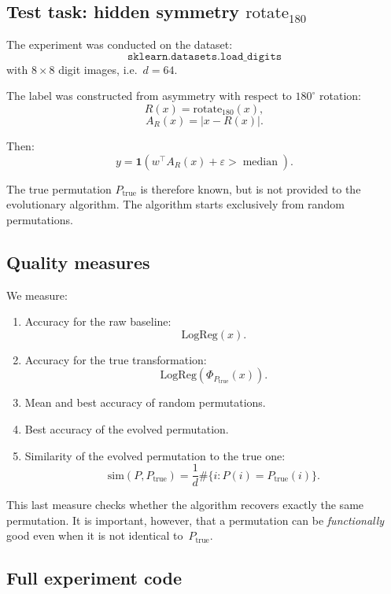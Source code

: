 \documentclass[11pt,a4paper]{report}
\begin{document}
\subsection{Test task: hidden symmetry \texorpdfstring{$\mathrm{rotate}_{180}$}{rotate180}}

The experiment was conducted on the dataset:
\[
\texttt{sklearn.datasets.load\_digits}
\]
with $8\times 8$ digit images, i.e.\ $d=64$.

The label was constructed from asymmetry with respect to $180^\circ$ rotation:
\[
R(x)=\mathrm{rotate}_{180}(x),
\]
\[
A_R(x)=|x-R(x)|.
\]

Then:
\[
y=
\mathbf 1
\left(
w^\top A_R(x)+\varepsilon
>
\operatorname{median}
\right).
\]

The true permutation $P_{\mathrm{true}}$ is therefore known, but is not provided to the evolutionary algorithm. The algorithm starts exclusively from random permutations.

\subsection{Quality measures}

We measure:

\begin{enumerate}
\item Accuracy for the raw baseline:
\[
\mathrm{LogReg}(x).
\]

\item Accuracy for the true transformation:
\[
\mathrm{LogReg}(\Phi_{P_{\mathrm{true}}}(x)).
\]

\item Mean and best accuracy of random permutations.

\item Best accuracy of the evolved permutation.

\item Similarity of the evolved permutation to the true one:
\[
\mathrm{sim}(P,P_{\mathrm{true}})
=
\frac{1}{d}
\#\{i:P(i)=P_{\mathrm{true}}(i)\}.
\]
\end{enumerate}

This last measure checks whether the algorithm recovers exactly the same permutation. It is important, however, that a permutation can be \emph{functionally} good even when it is not identical to~$P_{\mathrm{true}}$.

\subsection{Full experiment code}
\end{document}
